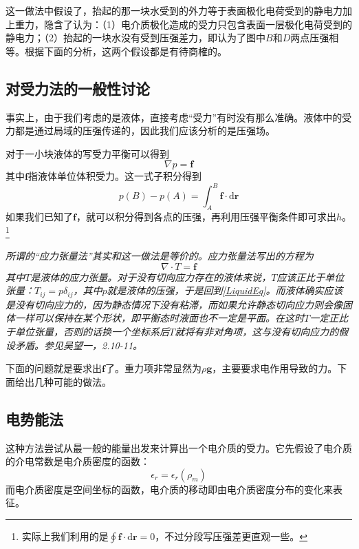 \documentclass{ctexart}
\begin{document}
	这一做法中假设了，抬起的那一块水受到的外力等于表面极化电荷受到的静电力加上重力，隐含了认为：（1）电介质极化造成的受力只包含表面一层极化电荷受到的静电力；（2）抬起的一块水没有受到压强差力，即认为了图中$B$和$D$两点压强相等。根据下面的分析，这两个假设都是有待商榷的。
	
	\subsection{对受力法的一般性讨论}
	
	事实上，由于我们考虑的是液体，直接考虑“受力”有时没有那么准确。液体中的受力都是通过局域的压强传递的，因此我们应该分析的是压强场。
	
	对于一小块液体的写受力平衡可以得到
	\begin{equation}\label{LiquidEq}
	\nabla p=\mathbf f
	\end{equation}
	其中$\mathbf f$指液体单位体积受力。这一式子积分得到
	\begin{equation}
	p(B)-p(A)=\int_A^B\mathbf f\cdot\mathrm d\mathbf r
	\end{equation}
	如果我们已知了$\mathbf f$，就可以积分得到各点的压强，再利用压强平衡条件即可求出$h$。\footnote{实际上我们利用的是$\oint \mathbf f\cdot\mathrm d\mathbf r=0$，不过分段写压强差更直观一些。}
	
	{\itshape 所谓的“应力张量法”其实和这一做法是等价的。应力张量法写出的方程为
	\begin{equation}
	\nabla\cdot T=\mathbf f
	\end{equation}
	其中$T$是液体的应力张量。对于没有切向应力存在的液体来说，$T$应该正比于单位张量：$T_{ij}=p\delta_{ij}$，其中$p$就是液体的压强，于是回到\eqref{LiquidEq}。而液体确实应该是没有切向应力的，因为静态情况下没有粘滞，而如果允许静态切向应力则会像固体一样可以保持在某个形状，即平衡态时液面也不一定是平面。在这时$T$一定正比于单位张量，否则的话换一个坐标系后$T$就将有非对角项，这与没有切向应力的假设矛盾。参见\textit{吴望一，2.10-11}。}

	下面的问题就是要求出$\mathbf f$了。重力项非常显然为$\rho\mathbf g$，主要要求电作用导致的力。下面给出几种可能的做法。
	
	\subsection{电势能法}\label{sec:EnergyD}
	
	这种方法尝试从最一般的能量出发来计算出一个电介质的受力。它先假设了电介质的介电常数是电介质密度的函数：
	\begin{equation}
	\epsilon_r=\epsilon_r(\rho_m)
	\end{equation}
	而电介质密度是空间坐标的函数，电介质的移动即由电介质密度分布的变化来表征。
	
\end{document}
